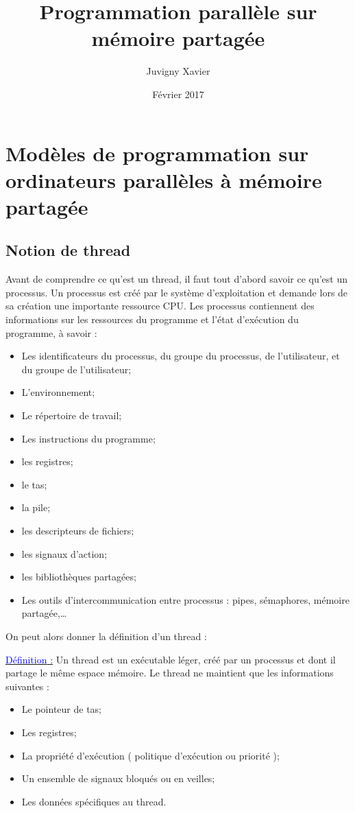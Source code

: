 \documentclass[fleqn,11pt]{article}
\title{Programmation parallèle sur mémoire partagée}
\author{Juvigny Xavier}
\date{Février 2017}
\begin{document}
\maketitle
\tableofcontents

\section{Modèles de programmation sur ordinateurs parallèles à mémoire partagée}

\subsection{Notion de thread}

Avant de comprendre ce qu'est un thread, il faut tout d'abord savoir ce qu'est un processus.
Un processus est créé par le système d'exploitation et demande lors de sa création une
importante ressource CPU. Les processus contiennent des informations sur les ressources
du programme et l'état d'exécution du programme, à savoir :
\begin{itemize}
 \item Les identificateurs du processus, du groupe du processus, de l'utilisateur, et du groupe de l'utilisateur;
 \item L'environnement;
 \item Le répertoire de travail;
 \item Les instructions du programme;
 \item les registres;
 \item le tas;
 \item la pile;
 \item les descripteurs de fichiers;
 \item les signaux d'action;
 \item les bibliothèques partagées;
 \item Les outils d'intercommunication entre processus : pipes, sémaphores, mémoire partagée,\ldots
\end{itemize}

On peut alors donner la définition d'un thread : 

\underline{\textcolor{blue}{Définition} :} Un thread est un exécutable léger,
créé par un processus et dont il partage le même espace mémoire. Le thread ne maintient
que les informations suivantes :
\begin{itemize}
 \item Le pointeur de tas;
 \item Les registres;
 \item La propriété d'exécution ( politique d'exécution ou priorité );
 \item Un ensemble de signaux bloqués ou en veilles;
 \item Les données spécifiques au thread.
\end{itemize}
\end{document}
